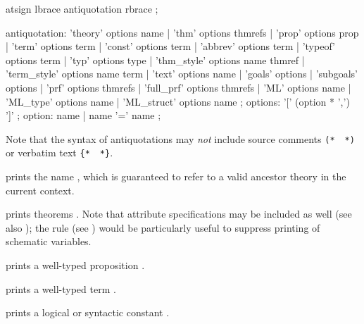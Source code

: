 \begin{isabellebody}
\begin{isamarkuptext}
  \begin{rail}
    atsign lbrace antiquotation rbrace
    ;

    antiquotation:
      'theory' options name |
      'thm' options thmrefs |
      'prop' options prop |
      'term' options term |
      'const' options term |
      'abbrev' options term |
      'typeof' options term |
      'typ' options type |
      'thm\_style' options name thmref |
      'term\_style' options name term |
      'text' options name |
      'goals' options |
      'subgoals' options |
      'prf' options thmrefs |
      'full\_prf' options thmrefs |
      'ML' options name |
      'ML\_type' options name |
      'ML\_struct' options name
    ;
    options: '[' (option * ',') ']'
    ;
    option: name | name '=' name
    ;
  \end{rail}

  Note that the syntax of antiquotations may \emph{not} include source
  comments \verb|(*|~\isa{{\isasymdots}}~\verb|*)| or verbatim
  text \verb|{|\verb|*|~\isa{{\isasymdots}}~\verb|*|\verb|}|.

  \begin{descr}
  
  \item [\isa{{\isacharat}{\isacharbraceleft}theory\ A{\isacharbraceright}}] prints the name , which is
  guaranteed to refer to a valid ancestor theory in the current
  context.

  \item [\isa{{\isacharat}{\isacharbraceleft}thm\ a\isactrlsub {\isadigit{1}}\ {\isasymdots}\ a\isactrlsub n{\isacharbraceright}}] prints theorems
  .  Note that attribute specifications
  may be included as well (see also ); the
   rule (see ) would
  be particularly useful to suppress printing of schematic variables.

  \item [\isa{{\isacharat}{\isacharbraceleft}prop\ {\isasymphi}{\isacharbraceright}}] prints a well-typed proposition \isa{{\isasymphi}}.

  \item [\isa{{\isacharat}{\isacharbraceleft}term\ t{\isacharbraceright}}] prints a well-typed term .

  \item [\isa{{\isacharat}{\isacharbraceleft}const\ c{\isacharbraceright}}] prints a logical or syntactic constant
  .
  

\end{descr}
\end{isamarkuptext}
\end{isabellebody}
